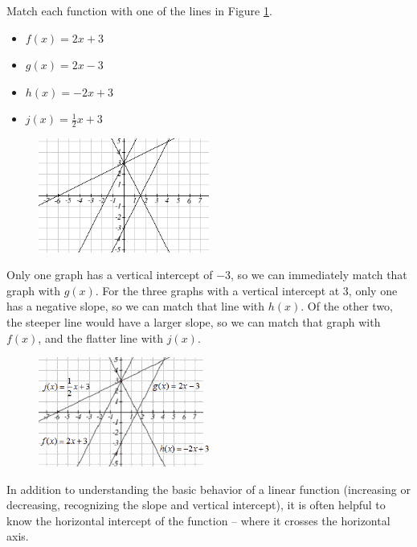 \begin{example}
Match each function with one of the lines in Figure \ref{fig:matchlines}.
\begin{itemize}[label={}]
    \item $f(x) = 2x+3$
    \item $g(x) = 2x-3$
    \item $h(x) = -2x+3$
    \item $j(x) = \frac{1}{2}x+3$
\end{itemize}
\begin{figure}[!ht]
  \centering
  \includegraphics[width=0.5\textwidth]{img/chap1/sec1-4/image052.png}
  \caption{}
  \label{fig:matchlines}
\end{figure}

\begin{solution} Only one graph has a vertical intercept of $-3$, so we can immediately match that graph with $g(x)$. For the three graphs with a vertical intercept at 3, only one has a negative slope, so we can match that line with $h(x)$. Of the other two, the steeper line would have a larger slope, so we can match that graph with $f(x)$, and the flatter line with $j(x)$.
\begin{figure}[!ht]
\centering
\includegraphics[width=0.5\textwidth]{img/chap1/sec1-4/image095.png}
\caption{}
\end{figure}

\end{solution}\end{example}

In addition to understanding the basic behavior of a linear function (increasing or decreasing, recognizing the slope and vertical intercept), it is often helpful to know the horizontal intercept of the function -- where it crosses the horizontal axis.

